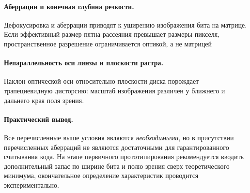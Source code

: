 \paragraph{Аберрации и конечная глубина резкости.}
Дефокусировка и аберрации приводят к уширению изображения бита на матрице. Если эффективный размер пятна рассеяния превышает размеры пикселя, пространственное разрешение ограничивается оптикой, а не матрицей

\paragraph{Непараллельность оси линзы и плоскости растра.}
Наклон оптической оси относительно плоскости диска порождает трапециевидную дисторсию: масштаб изображения различен у ближнего и дальнего края поля зрения.

\paragraph{Практический вывод.}
Все перечисленные выше условия являются \textit{необходимыми}, но в присутствии перечисленных аберраций не являются достаточными для гарантированного считывания кода. На этапе первичного прототипирования рекомендуется вводить дополнительный запас по ширине бита и полю зрения сверх теоретического минимума, окончательное определение характеристик проводится экспериментально.
